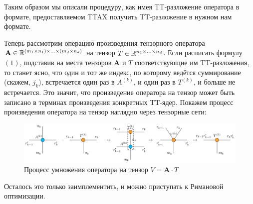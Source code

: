 \documentclass[12pt]{article}
\newcommand{\mbf}{\mathbf}
\begin{document}
    Таким образом мы описали процедуру, как имея TT-разложение оператора в формате, предоставляемом TTAX получить TT-разложение в нужном нам формате.

    Теперь рассмотрим операцию произведения тензорного оператора $\mbf{A} \in \RR^{(m_1 \times n_1) \times \ldots \times (m_d \times n_d)}$
    на тензор $T \in \mathbb{R}^{n_1 \times \ldots \times n_d}$. Если расписать формулу $(1)$, подставив на места тензоров $\mbf{A}$ и $T$ соответствующие им
    TT-разложения, то станет ясно, что один и тот же индекс, по которому ведётся суммирование (скажем, $j_k$), встречается один раз в $A^{(k)}$,
    и один раз в $T^{(k)}$, и больше не встречается. Это значит, что произведение оператора на тензор может быть записано в терминах произведения
    конкретных TT-ядер. Покажем процесс произведения оператора на тензор наглядно через тензорные сети:

    \begin{figure}
        \centering
        \includegraphics[scale=0.92]{./pic/tensornet_product}
        \caption{Процесс умножения оператора на тензор $V = \mbf{A}\cdot T$}
    \end{figure}

    Осталось это только заимплементить, и можно приступать к Римановой оптимизации.
\end{document}
